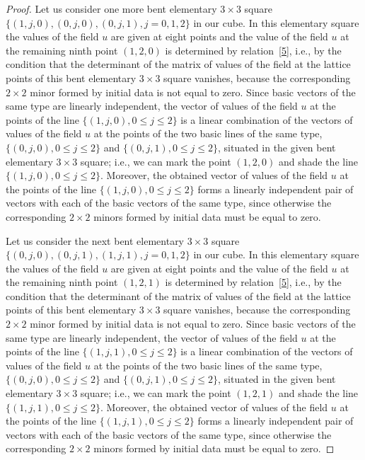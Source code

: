 \documentclass[11pt]{article}
\begin{document}
\begin{proof}
Let us consider one more bent elementary $3 \times 3$ square $\{(1,
j, 0), (0, j, 0), (0, j, 1),  j = 0, 1, 2\}$ in our cube. In this
elementary square the values of the f\/ield $u$ are given at eight
points and the value of the f\/ield $u$ at the remaining ninth point
$(1, 2, 0)$ is determined by relation~\eqref{5}, i.e., by the
condition that the determinant of the matrix of values of the f\/ield
at the lattice points of this bent elementary $3 \times 3$ square
vanishes, because the corresponding $2 \times 2$ minor formed by
initial data is not equal to zero. Since basic vectors of the same
type are linearly independent, the vector of values of the f\/ield $u$
at the points of the line $\{(1, j, 0), 0 \leq j \leq 2\}$ is a
linear combination of the vectors of values of the f\/ield $u$ at the
points of the two basic lines of the same type, $\{(0, j, 0), 0 \leq
j \leq 2\}$ and $\{(0, j, 1), 0 \leq j \leq 2\}$, situated in the
given bent elementary $3 \times 3$ square; i.e., we can mark the
point $(1, 2, 0)$ and shade the line $\{(1, j, 0), 0 \leq j \leq
2\}$. Moreover, the obtained vector of values of the f\/ield $u$ at
the points of the line $\{(1, j, 0), 0 \leq j \leq 2\}$ forms a
linearly independent pair of vectors with each of the basic vectors
of the same type, since otherwise the corresponding $2 \times 2$
minors formed by initial data must be equal to zero.



Let us consider the next bent elementary $3 \times 3$ square $\{(0,
j, 0), (0, j, 1), (1, j, 1), j = 0, 1, 2\}$ in our cube. In this
elementary square the values of the f\/ield $u$ are given at eight
points and the value of the f\/ield $u$ at the remaining ninth point
$(1, 2, 1)$ is determined by relation~\eqref{5}, i.e., by the
condition that the determinant of the matrix of values of the f\/ield
at the lattice points of this bent elementary $3 \times 3$ square
vanishes, because the corresponding $2 \times 2$ minor formed by
initial data is not equal to zero. Since basic vectors of the same
type are linearly independent, the vector of values of the f\/ield $u$
at the points of the line $\{(1, j, 1), 0 \leq j \leq 2\}$ is a
linear combination of the vectors of values of the f\/ield $u$ at the
points of the two basic lines of the same type, $\{(0, j, 0), 0 \leq
j \leq 2\}$ and $\{(0, j, 1), 0 \leq j \leq 2\}$, situated in the
given bent elementary $3 \times 3$ square; i.e., we can mark the
point $(1, 2, 1)$ and shade the line $\{(1, j, 1), 0 \leq j \leq
2\}$. Moreover, the obtained vector of values of the f\/ield $u$ at
the points of the line $\{(1, j, 1), 0 \leq j \leq 2\}$ forms a
linearly independent pair of vectors with each of the basic vectors
of the same type, since otherwise the corresponding $2 \times 2$
minors formed by initial data must be equal to zero.




\end{proof}
\end{document}
